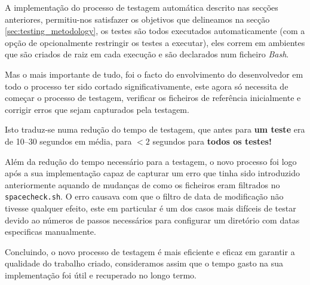 A implementação do processo de testagem automática descrito nas secções
anteriores, permitiu-nos satisfazer os objetivos que delineamos na secção
\ref{sec:testing_metodology}, os testes são todos executados automaticamente
(com a opção de opcionalmente restringir os testes a executar), eles correm em
ambientes que são criados de raiz em cada execução e são declarados num ficheiro
\emph{Bash}.

Mas o mais importante de tudo, foi o facto do envolvimento do desenvolvedor
em todo o processo ter sido cortado significativamente, este agora só necessita
de começar o processo de testagem, verificar os ficheiros de referência
inicialmente e corrigir erros que sejam capturados pela testagem.

Isto traduz-se numa redução do tempo de testagem, que antes para
\textbf{um teste} era de \numrange{10}{30} segundos em média, para
$< 2$ segundos para \textbf{todos os testes!}

Além da redução do tempo necessário para a testagem, o novo processo foi logo
após a sua implementação capaz de capturar um erro que tinha sido introduzido
anteriormente aquando de mudanças de como os ficheiros eram filtrados no
\Verb|spacecheck.sh|. O erro causava com que o filtro de data de modificação não
tivesse qualquer efeito, este em particular é um dos casos mais difíceis de
testar devido ao números de passos necessários para configurar um diretório com
datas especificas manualmente.

Concluindo, o novo processo de testagem é mais eficiente e eficaz em garantir
a qualidade do trabalho criado, consideramos assim que o tempo gasto na sua
implementação foi útil e recuperado no longo termo.
